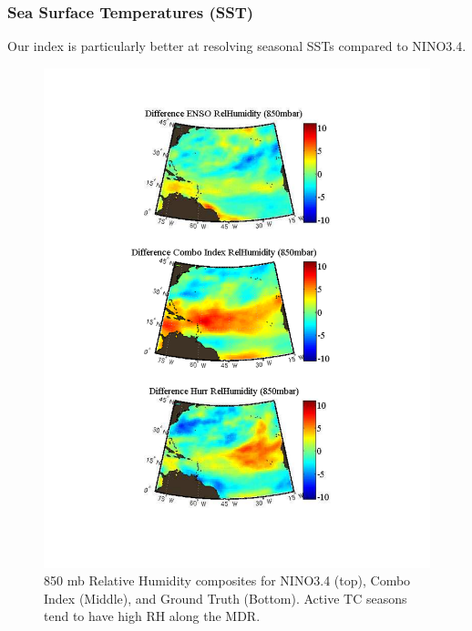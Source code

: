 \documentclass[]{article}
\begin{document}
\subsubsection{Sea Surface Temperatures (SST)}
Our index is particularly better at resolving seasonal SSTs compared to NINO3.4.

\begin{figure}[ht]
\begin{minipage}[b]{0.55\linewidth}
\includegraphics[width=\textwidth]{figures/comboIndex/composites/compareMDRCompositesRelativeHumidity.pdf}
\caption{850 mb Relative Humidity composites for NINO3.4 (top), Combo Index (Middle), and Ground Truth (Bottom). Active TC seasons tend to have high RH along the MDR.}
\label{fig:rh850_comp}
\end{minipage}
\hspace{0.3cm}
\begin{minipage}[b]{0.55\linewidth}

\end{minipage}
\end{figure}
\end{document}
